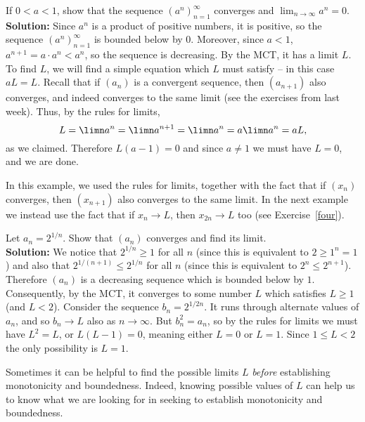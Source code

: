 \documentclass[11pt,dvipsnames]{book}
\numberwithin{figure}{section} %
\numberwithin{table}{section} %
\begin{document}
\begin{example}
\label{ex:power}
If $0<a<1$, show that the sequence $(a^n)_{n=1}^\infty$ converges and $\lim_{n\rightarrow\infty} a^{n}=0$. \\

\noindent
{\bf Solution:} Since $a^n$ is a product of positive numbers, it is positive, so the sequence $(a^{n})_{n=1}^{\infty}$ is bounded below by $0$. Moreover, since $a<1$, $a^{n+1}=a\cdot a^{n}<a^{n}$, so the sequence is decreasing. By the MCT, it has a limit $L$. To find $L$, we will find a simple equation which $L$ must satisfy -- in this case $aL = L$. Recall that if $(a_{n})$ is a convergent sequence, then $(a_{n+1})$ also converges, and indeed converges to the same limit (see the exercises from last week). Thus, by the rules for limits,
\[
L=\limn a^{n} = \limn a^{n+1}=\limn a^{n} =a\limn a^{n}=aL,\]
as we claimed. Therefore $L(a-1) =0$ and since $a \neq 1$ we must have $L =0$, and we are done.
\end{example}
In this example, we used the rules for limits, together with the fact that if $(x_n)$ converges, then $(x_{n+1})$
also converges to the same limit. In the next example we instead use the fact that if $x_n \to L$, then $x_{2n} \to L$ too (see Exercise~\ref{four}).

\begin{example}\label{2^{1/n}}
Let $a_n = 2^{1/n}$. Show that $(a_n)$ converges and find its limit.\\

\noindent
{\bf Solution:} We notice that $2^{1/n} \geq 1$ for all $n$ (since this is equivalent to $2 \geq 1^n = 1$) and also that $2^{1/(n+1)} \leq 2^{1/n}$
for all $n$ (since this is equivalent to
$2^n \leq 2^{n+1}$). Therefore $(a_n)$ is a decreasing sequence which is bounded below by $1$. Consequently, by the MCT, it converges to some number $L$ which satisfies $L\geq1$ (and $L< 2$). %
Consider the sequence $b_n = 2^{1/2n}$. It runs through alternate values of $a_n$, and so $b_n \to L$ also as $n \to \infty$. But $b_n^2 = a_n$, so by the rules for limits we must have $L^2 = L$, or $L(L-1) =0$, meaning either $L=0$ or $L=1$. Since $1 \leq L < 2$ the only possibility is $L = 1$.
\end{example}
Sometimes it can be helpful to find the possible limits $L$ {\em before}
establishing monotonicity and boundedness. Indeed, knowing possible values of $L$ can help us to know what we are looking for in seeking to establish monotonicity and boundedness.
\end{document}
